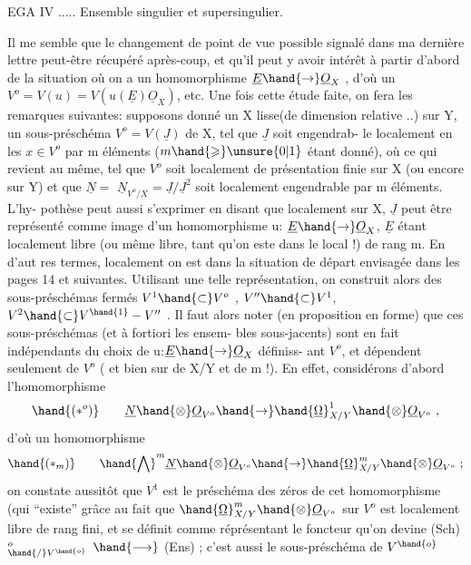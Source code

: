 
EGA IV ..... Ensemble singulier et supersingulier.

Il me semble que le changement de point de vue possible signalé dans ma
dernière lettre peut-être récupéré après-coup, et qu'il peut y avoir intérêt
à partir d'abord de la situation où on a  un homomorphisme $\underline{E}\hand{\to}\underline{O}_X$ , d'où
un $V^o = V(u) = V(u(\underline{E})\underline{O}_X)$, etc. Une fois cette étude faite, on fera les
remarques suivantes: supposons donné un X lisse(de dimension relative  ..)
sur Y, un sous-préschéma $V^o = V(\underline{J})$ de X, tel que $\underline{J}$\shortstack[l]{\\} soit engendrab-%
le localement en les  $x\in V^o$ par m éléments ($m\hand{\geqslant}\unsure{0|1}$ étant donné), où ce qui revient au
même, tel que $V^o$ soit localement de présentation finie sur X (ou encore sur
Y) et que $\underline{N} =$ $\underline{N}_{V^o/X} = \underline{J}/\underline{J}^2$  soit localement engendrable par m éléments.  L'hy-%
pothèse peut aussi s'exprimer en disant que localement sur X, $\underline{J}$ peut être
représenté comme image d'un homomorphisme  u: $\underline{E}\hand{\to}\underline{O}_X$, $\underline{E}$ étant localement
libre (ou même libre, tant qu'on este dans le local !) de rang m.  En d'aut
res termes, localement on est dans la situation de départ envisagée dans
les pages 14 et suivantes. Utilisant une telle représentation, on construit
alors des sous-préschémas fermés $V^1 \hand{\subset} V^o$ , $V'' \hand{\subset} V^1$, $V^2 \hand{\subset} V^{\hand{1}}-V''$ . Il faut alors noter
(en proposition en forme) que ces sous-préschémas (et à fortiori les ensem-%
bles sous-jacents) sont en fait indépendants du choix de u:$\underline{E}\hand{\to}\underline{O}_X$ définiss-%
ant $V^o$,  et dépendent seulement de  $V^o$ ( et bien sur de X/Y et de
m !).  En effet, considérons d'abord  l'homomorphisme
\[ \hand{(*^o)} \qquad \underline{N}\hand{\otimes}\underline{O}_{V^o}\hand{\to}\hand{\underline{\Omega}}^1_{X/Y}\hand{\otimes}\underline{O}_{V^o} \ , \]
d'où  un homomorphisme
\[ \hand{(*_m)} \qquad \hand{\bigwedge}^m\underline{N}\hand{\otimes}\underline{O}_{V^o}\hand{\to}\hand{\underline{\Omega}}^{m}_{X/Y}\hand{\otimes}\underline{O}_{V^o}\ ; \]
on constate aussitôt que $V^1$ est le préschéma des zéros de cet homomorphisme
(qui ``existe'' grâce au fait que $\hand{\underline{\Omega}}^{m}_{X/Y}\hand{\otimes}\underline{O}_{V^{o}}$  sur  $V^o$ est localement libre
de rang fini, et se définit comme réprésentant le foncteur qu'on devine
(Sch)$^o_{\hand{/}V^{\hand{o}}}$ $\hand{\longrightarrow}$ (Ens) ; c'est aussi le sous-préschéma de $V^{\hand{o}}$

